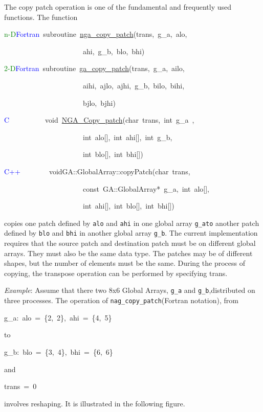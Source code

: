 The copy patch operation is one of the fundamental and frequently
used functions. The function
\begin{lyxcode}
\textcolor{green}{n-D}\textcolor{blue}{Fortran}~subroutine~\href{http://www.emsl.pnl.gov/docs/global/ga_ops.html\#ga_copy_patch}{nga\_{}copy\_{}patch}(trans,~g\_a,~alo,~

~~~~~~~~~~~~~~~~~~~~~~ahi,~g\_b,~blo,~bhi)~

\textcolor{green}{2-D}\textcolor{blue}{Fortran}~subroutine~\href{http://www.emsl.pnl.gov/docs/global/ga_ops.html\#ga_copy_patch}{ga\_{}copy\_{}patch}(trans,~g\_a,~ailo,~

~~~~~~~~~~~~~~~~~~~~~~aihi,~ajlo,~ajhi,~g\_b,~bilo,~bihi,~

~~~~~~~~~~~~~~~~~~~~~~bjlo,~bjhi)~

\textcolor{blue}{C~}~~~~~~~~~void~\href{http://www.emsl.pnl.gov/docs/global/c_nga_ops.html\#ga_copy_patch}{NGA\_{}Copy\_{}patch}(char~trans,~int~g\_a~,~

~~~~~~~~~~~~~~~~~~~~~~int~alo{[}{]},~int~ahi{[}{]},~int~g\_b,~

~~~~~~~~~~~~~~~~~~~~~~int~blo{[}{]},~int~bhi{[}{]})~

\textcolor{blue}{C++}~~~~~~~~voidGA::GlobalArray::copyPatch(char~trans,~

~~~~~~~~~~~~~~~~~~~~~~const~GA::GlobalArray{*}~g\_a,~int~alo{[}{]},~

~~~~~~~~~~~~~~~~~~~~~~int~ahi{[}{]},~int~blo{[}{]},~int~bhi{[}{]})
\end{lyxcode}
copies one patch defined by \texttt{alo} and \texttt{ahi} in one global
array \texttt{g\_ato} another patch defined by \texttt{blo} and \texttt{bhi}
in another global array \texttt{g\_b}. The current implementation
requires that the source patch and destination patch must be on different
global arrays. They must also be the same data type. The patches may
be of different shapes, but the number of elements must be the same.
During the process of copying, the transpose operation can be performed
by specifying trans.

\emph{Example}: Assume that there two 8x6 Global Arrays, \texttt{g\_a}
and \texttt{g\_b},distributed on three processes. The operation of
\texttt{nag\_copy\_patch}(Fortran notation), from
\begin{lyxcode}
g\_a:~alo~=~\{2,~2\},~ahi~=~\{4,~5\}
\end{lyxcode}
to
\begin{lyxcode}
g\_b:~blo~=~\{3,~4\},~bhi~=~\{6,~6\}
\end{lyxcode}
and
\begin{lyxcode}
trans~=~0
\end{lyxcode}
involves reshaping. It is illustrated in the following figure. 

